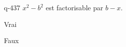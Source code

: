 \begin{truefalse}{q-437}
$x^2-b^2$ est factorisable par $b-x$.
\item* Vrai
\item Faux
\end{truefalse}

